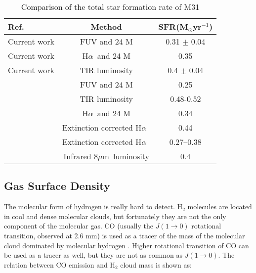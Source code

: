 \documentclass[useAMS,usenatbib]{mn2e}
\newcommand \halpha    {H$\alpha $\ }
\newcommand \um    {$\mu$m\ }
\begin{document}
\begin{table*}
\begin{minipage}{100mm}
\caption{Comparison of the total star formation rate of M31}
\label{table:sfr}
\begin{tabular}{@{}lcc}
\hline\hline
Ref.&Method&SFR(M$_{\odot}$yr$^{-1}$) \\
\hline
Current work&FUV and 24 M&0.31 $\pm$ 0.04\\
Current work&\halpha and 24 M&0.35 \\
Current work&TIR luminosity&0.4 $\pm$ 0.04\\
\cite{Ford13}&FUV and 24 M&0.25\\
\cite{Ford13}&TIR luminosity&0.48-0.52\\
\cite{Azimlu11}& \halpha and 24 M&0.34\\
\cite{Azimlu11}&Extinction corrected \halpha&0.44\\
\cite{Tabatabaei10}&Extinction corrected \halpha&0.27--0.38\\
\cite{Barmby06}&Infrared 8\um luminosity& 0.4\\
\hline
\end{tabular}
\end{minipage}
\end{table*}


\subsection{Gas Surface Density}
\label{sec:ISM}

 The molecular form of hydrogen is really hard to detect. H$_2$ molecules are located in cool and dense molecular clouds, but fortunately they are not the only component of the molecular gas. CO (usually the $J(1\rightarrow 0)$ rotational transition, observed at 2.6 mm) is used as a tracer of the mass of the molecular cloud dominated by molecular hydrogen \citep[see, for example,][] {Sanders84}. Higher rotational transition of CO can be used as a tracer as well, but they are not as common as $J(1\rightarrow 0)$. The relation between CO emission and H$_2$ cloud mass is shown as:
\end{document}
